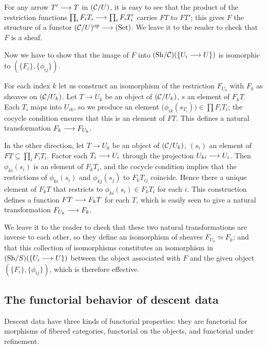 \begin{4   STACKS}
\begin{4.1 Descent of objects of fibcats}
\begin{example}
For any arrow $T' \arr T$ in $(\mathcal{C}/U)$, it is easy to see that the product of the restriction functions $\prod_{i}F_{i} T_{i} \arr \prod_{i}F_{i} T'_{i}$ carries $F T$ to $F T'$; this gives $F$ the structure of a functor $(\cC/U)\op \arr \catset$. We leave it to the reader to check that $F$ is a sheaf.

Now we have to show that the image of $F$ into $({\mathrm{Sh}/\mathcal{C}})(\{U_{i} \longrightarrow U\})$ is isomorphic to $(\{F_{i}\}, \{\phi_{ij}\})$.

For each index $k$ let us construct an isomorphism of the restriction $F_{U_{k}}$ with $F_{k}$ as sheaves on $(\mathcal{C}/U_{k})$. Let $T \to U_{k}$ be an object of $(\mathcal{C}/U_{k})$, $s$ an element of $F_{k} T$. Each $T_{i}$ maps into $U_{ik}$, so we produce an element $\bigl(\phi_{ik}(s_{T_{i}})\bigr) \in \prod F_{i}T_{i}$; the cocycle condition ensures that this is an element of $F T$. This defines a natural transformation $F_{k} \arr F_{U_{k}}$.

In the other direction, let $T \to U_{k}$ be an object of $(\mathcal{C}/U_{k})$, $(s_{i})$ an element of $F T \subseteq \prod_{i}F_{i} T_{i}$. Factor each $T_{i} \arr U_{i}$ through the projection $U_{ki} \arr U_{i}$. Then $\phi_{ki}(s_{i})$ is an element of $F_k T_{i}$, and the cocycle condition implies that the restrictions of $\phi_{ki}(s_{i})$ and $\phi_{kj}(s_{j})$ to $F_{k}T_{ij}$ coincide. Hence there a unique element of $F_{k} T$ that restricts to $\phi_{ki}(s_{i}) \in F_{k} T_{i}$ for each $i$. This construction defines a function $F T \arr F_{k} T$ for each $T$, which is easily seen to give a natural transformation $F_{U_{k}} \arr F_{k}$.

We leave it to the reader to check that these two natural transformations are inverse to each other, so they define an isomorphism of sheaves $F_{U_{k}} \simeq F_{k}$; and that this collection of isomorphisms constitutes an isomorphism in $\catsh{S}(\{U_{i} \arr U\})$ between the object associated with $F$ and the given object $(\{F_{i}\}, \{\phi_{ij}\})$, which is therefore effective.
\end{example}


\subsection{The functorial behavior of descent data}\label{subsec:func-descent-data}


Descent data have three kinds of functorial properties: they are functorial for morphisms of fibered categories, functorial on the objects, and functorial under refinement.


\end{4.1 Descent of objects of fibcats}
\end{4   STACKS}
